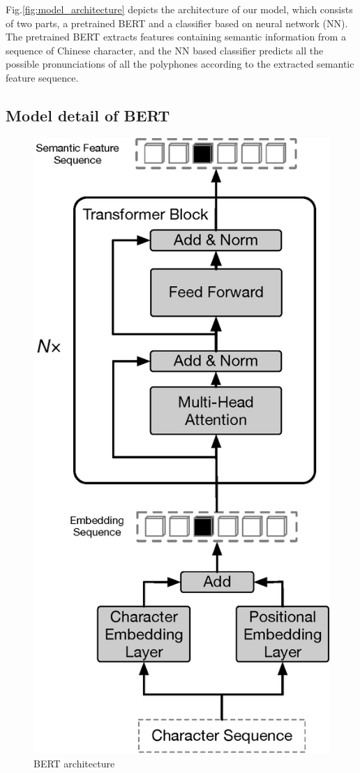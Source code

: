 \documentclass[a4paper]{article}
\begin{document}
Fig.\ref{fig:model_architecture} depicts the architecture of our model, which consists of two parts, a pretrained BERT and a classifier based on neural network (NN). The pretrained BERT extracts features containing semantic information from a sequence of Chinese character, and the NN based classifier predicts all the possible pronunciations of all the polyphones according to the extracted semantic feature sequence.


\subsection{Model detail of BERT}

\begin{figure}[t]
	\centering
	\includegraphics[scale=0.4]{pics/bert2.eps}
	\caption{BERT architecture}
	\label{fig:bert}
\end{figure}
\end{document}
